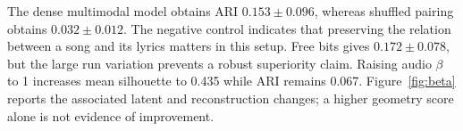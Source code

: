 The dense multimodal model obtains ARI $0.153\pm0.096$, whereas shuffled pairing obtains $0.032\pm0.012$. The negative control indicates that preserving the relation between a song and its lyrics matters in this setup. Free bits gives $0.172\pm0.078$, but the large run variation prevents a robust superiority claim. Raising audio $\beta$ to 1 increases mean silhouette to 0.435 while ARI remains 0.067. Figure~\ref{fig:beta} reports the associated latent and reconstruction changes; a higher geometry score alone is not evidence of improvement.
